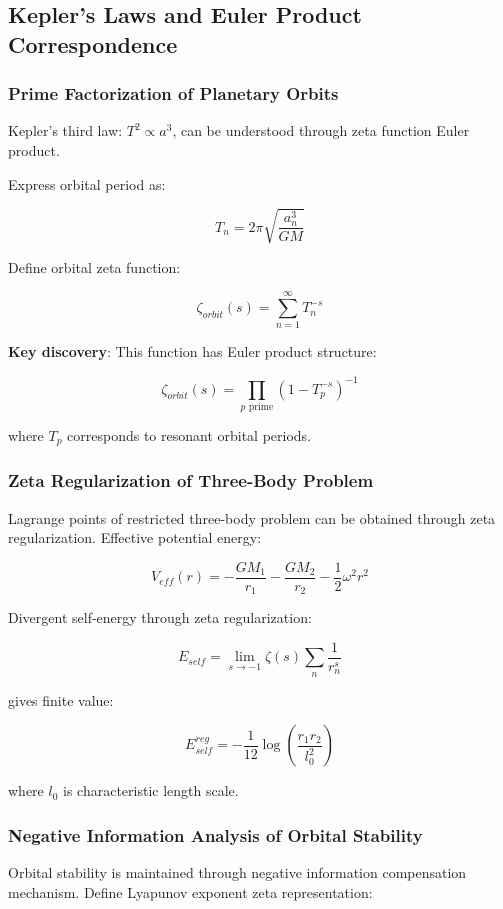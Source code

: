 \documentclass[12pt,a4paper]{article}
\begin{document}
\subsection{Kepler's Laws and Euler Product Correspondence}

\subsubsection{Prime Factorization of Planetary Orbits}

Kepler's third law: $T^2 \propto a^3$, can be understood through zeta function Euler product.

Express orbital period as:

$$T_n = 2\pi \sqrt{\frac{a_n^3}{GM}}$$

Define orbital zeta function:

$$\zeta_{orbit}(s) = \sum_{n=1}^{\infty} T_n^{-s}$$

\textbf{Key discovery}: This function has Euler product structure:

$$\zeta_{orbit}(s) = \prod_{p \text{ prime}} \left(1 - T_p^{-s}\right)^{-1}$$

where $T_p$ corresponds to resonant orbital periods.

\subsubsection{Zeta Regularization of Three-Body Problem}

Lagrange points of restricted three-body problem can be obtained through zeta regularization. Effective potential energy:

$$V_{eff}(r) = -\frac{GM_1}{r_1} - \frac{GM_2}{r_2} - \frac{1}{2}\omega^2 r^2$$

Divergent self-energy through zeta regularization:

$$E_{self} = \lim_{s \to -1} \zeta(s) \sum_n \frac{1}{r_n^s}$$

gives finite value:

$$E_{self}^{reg} = -\frac{1}{12} \log\left(\frac{r_1 r_2}{l_0^2}\right)$$

where $l_0$ is characteristic length scale.

\subsubsection{Negative Information Analysis of Orbital Stability}

Orbital stability is maintained through negative information compensation mechanism. Define Lyapunov exponent zeta representation:
\end{document}
